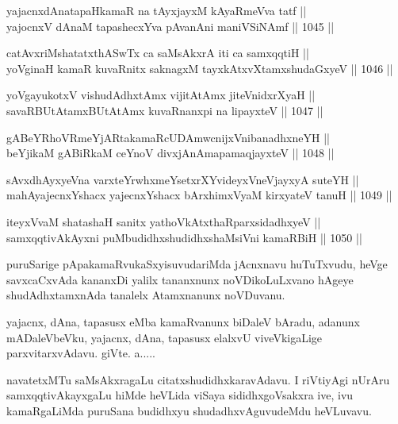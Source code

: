 \begin{shl}
yajacnxdAnatapaHkamaR na tAyxjayxM kAyaRmeVva tatf || \\
yajocnxV dAnaM tapashecxYva pAvanAni maniVSiNAmf ||  1045 ||  
\end{shl}
				
\begin{shl}
catAvxriMshatatxthA\s SwTx ca saMsAkxrA iti ca samxqqtiH || \\
yoVginaH kamaR kuvaRnitx saknagxM tayxkAtxvX\s \s tamxshudaGxyeV ||  1046 ||  
\end{shl}
				
\begin{shl}
yoVgayukotxV vishudAdhxtAmx vijitAtAmx jiteVnidxrXyaH || \\
savaRBUtAtamxBUtAtAmx kuvaRnanxpi na lipayxteV ||  1047 ||  
\end{shl}
				
\begin{shl}
gABeYRhoVRmeYjARtakamaRcUDAmwcnijxVnibanadhxneYH || \\
beYjikaM gABiRkaM ceYnoV divxjAnAmapamaqjayxteV ||  1048 ||  
\end{shl}
				
\begin{shl}
sAvxdhAyxyeVna varxteYrwhxmeYsetxrXYvideyxVneVjayxyA suteYH || \\
mahAyajecnxYshacx yajecnxYshacx bArxhimxVyaM kirxyateV tanuH ||  1049 ||  
\end{shl}
				
\begin{shl}
iteyxVvaM shatashaH sanitx yathoVkAtxthaRparxsidadhxyeV ||  \\
samxqqtivAkAyxni puMbudidhxshudidhxshaMsiVni kamaRBiH ||  1050 ||  
\end{shl}

\begin{artha}
puruSarige pApakamaRvukaSxyisuvudariMda jAcnxnavu huTuTxvudu, heVge savxcaCxvAda kananxDi yalilx tananxnunx noVDikoLuLxvano hAgeye shudAdhxtamxnAda  tanalelx Atamxnanunx noVDuvanu.
\end{artha}

\begin{artha}
yajacnx, dAna, tapasusx eMba kamaRvanunx biDaleV bAradu, adanunx mADaleVbeVku, yajacnx, dAna, tapasusx elalxvU viveVkigaLige parxvitarxvAdavu. giVte. a.....
\end{artha}

\begin{artha}
navatetxMTu saMsAkxragaLu citatxshudidhxkaravAdavu. I riVtiyAgi nUrAru samxqqtivAkayxgaLu hiMde heVLida viSaya sididhxgoVsakxra ive, ivu kamaRgaLiMda puruSana budidhxyu shudadhxvAguvudeMdu heVLuvavu.
\end{artha}

